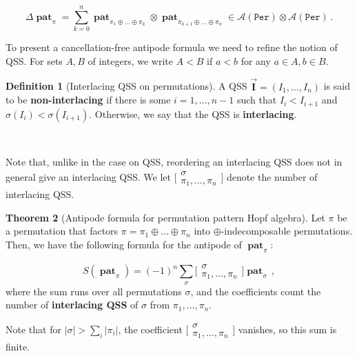 \documentclass[12pt, reqno]{amsart}
\theoremstyle{definition}
\newtheorem{thm}{Theorem}[section]
\newtheorem{defin}[thm]{Definition}
\newcommand{\III}{\vec{\mathbf{I}}}
\DeclareMathOperator{\pat}{\mathbf{pat}}
\begin{document}
\begin{equation}\label{eq:coprodperm}
\Delta \pat_{\pi} = \sum_{k=0}^n \pat_{\pi_1\oplus \dots \oplus \pi_k} \otimes \pat_{\pi_{k+1}\oplus \dots \oplus \pi_n} \in \mathcal A (\mathtt{Per}) \otimes \mathcal A (\mathtt{Per})\, .
\end{equation}

To present a cancellation-free antipode formula we need to refine the notion of QSS.
For sets $A, B$ of integers, we write $A <B$ if $a<b $ for any $a\in A, b \in B$.

\begin{defin}[Interlacing QSS on permutations]
A QSS $\III = (I_1, \dots, I_n)$ is said to be \textbf{non-interlacing} if there is some $i=1, \dots, n-1$ such that $I_i < I_{i+1}$ and $\sigma(I_i) < \sigma(I_{i+1})$.
Otherwise, we say that the QSS is \textbf{interlacing}. 

\

Note that, unlike in the case on QSS, reordering an interlacing QSS does not in general give an interlacing QSS.
We let $\bigl[\!\begin{smallmatrix} \sigma \\ \pi_1, \dots, \pi_n \end{smallmatrix}\!\bigr]$ denote the number of interlacing QSS.
\end{defin}


\begin{thm}[Antipode formula for permutation pattern Hopf algebra]\label{thm:antipode_perms_intro}
Let $\pi$ be a permutation that factors $\pi = \pi_1\oplus \dots \oplus \pi_n$ into $\oplus$-indecomposable permutations.
Then, we have the following formula for the antipode of $\pat_{\pi}$:

$$S(\pat_{\pi}) = (-1)^n \sum_{\sigma} \bigl[\!\begin{smallmatrix} \sigma \\ \pi_1, \dots, \pi_n \end{smallmatrix}\!\bigr] \pat_{\sigma}\, ,$$
where the sum runs over all permutations $\sigma$, and the coefficients count the number of \textbf{interlacing QSS} of $\sigma$ from $\pi_1, \dots, \pi_n$.
\end{thm}

Note that for $|\sigma| > \sum_i |\pi_i|$, the coefficient $\bigl[\!\begin{smallmatrix} \sigma \\ \pi_1, \dots, \pi_n \end{smallmatrix}\!\bigr]$ vanishes, so this sum is finite.
\end{document}
